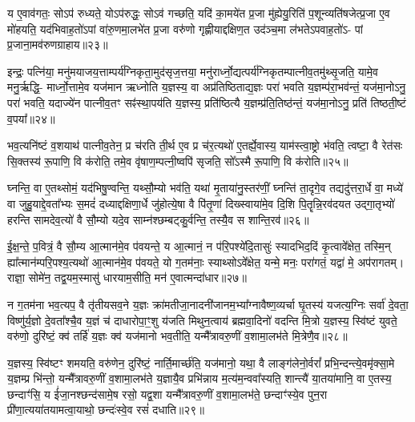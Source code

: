 य ए॒वाव॑गतः॒ सो\-ऽप॑ रुध्यते॒ यो\-ऽप॑रुद्धः॒ सो\-ऽव॑ गच्छति॒ यदि॑ का॒मये॑त प्र॒जा मु॑ह्येयु॒रिति॑ प॒शून्व्यति॑षजेत्प्र॒जा ए॒व मो॑हयति॒ यद॑भिवाह॒तो॑\-ऽपां वा॑रु॒णमा॒लभे॑त प्र॒जा वरु॑णो गृह्णीयाद्दक्षिण॒त उद॑ञ्च॒मा ल॑भते\-ऽपवाह॒तो॑\-ऽ- पां प्र॒जाना॒मव॑रुणग्राहाय॥२३॥

{\anuvakamend[{रेतो॒ यज॑माने दधाति लो॒क ऐ॒न्द्रꣳ स॒प्तत्रिꣳ॑शच्च॥५॥}]}

इन्द्रः॒ पत्नि॑या॒ मनु॑मयाजय॒त्ताम्पर्य॑ग्निकृता॒मुद॑सृज॒त्तया॒ मनु॑रार्ध्नो॒द्यत्पर्य॑ग्निकृतम्पात्नीव॒तमु॑थ्सृ॒जति॒ यामे॒व मनु॒र्\mbox{}ऋद्धि॒- मार्ध्नो॒त्तामे॒व यज॑मान ऋध्नोति य॒ज्ञस्य॒ वा अप्र॑तिष्ठिताद्य॒ज्ञः परा॑ भवति य॒ज्ञम्प॑रा॒भव॑न्तं॒ यज॑मा॒नो\-ऽनु॒ परा॑ भवति॒ यदाज्ये॑न पात्नीव॒तꣳ सꣴ॑स्था॒पय॑ति य॒ज्ञस्य॒ प्रति॑ष्ठित्यै य॒ज्ञम्प्र॑ति॒तिष्ठ॑न्तं॒ यज॑मा॒नो\-ऽनु॒ प्रति॑ तिष्ठती॒ष्टं व॒पया᳚॥२४॥

भव॒त्यनि॑ष्टं व॒शयाथ॑ पात्नीव॒तेन॒ प्र च॑रति ती॒र्थ ए॒व प्र च॑र॒त्यथो॑ ए॒तर्\mbox{}ह्ये॒वास्य॒ याम॑स्त्वा॒ष्ट्रो भ॑वति॒ त्वष्टा॒ वै रेत॑सः सि॒क्तस्य॑ रू॒पाणि॒ वि क॑रोति॒ तमे॒व वृ॑षाण॒म्पत्नी॒ष्वपि॑ सृजति॒ सो᳚\-ऽस्मै रू॒पाणि॒ वि क॑रोति॥२५॥

{\anuvakamend[{व॒पया॒ षट्त्रिꣳ॑शच्च॥६॥}]}

घ्नन्ति॒ वा ए॒तथ्सोमं॒ यद॑भिषु॒ण्वन्ति॒ यथ्सौ॒म्यो भव॑ति॒ यथा॑ मृ॒ताया॑नु॒स्तर॑णीं॒ घ्नन्ति॑ ता॒दृगे॒व तद्यदु॑त्तरा॒र्धे वा॒ मध्ये॑ वा जुहु॒याद्दे॒वता᳚भ्यः स॒मदं॑ दध्याद्दक्षिणा॒र्धे जु॑होत्ये॒षा वै पि॑तृ॒णां दिख्स्वाया॑मे॒व दि॒शि पि॒तॄन्नि॒रव॑दयत उद्गा॒तृभ्यो॑ हरन्ति सामदेव॒त्यो॑ वै सौ॒म्यो यदे॒व साम्न॑श्छम्बट्कु॒र्वन्ति॒ तस्यै॒व स शान्ति॒रव॑॥२६॥

ई॒क्ष॒न्ते॒ प॒वित्रं॒ वै सौ॒म्य आ॒त्मान॑मे॒व प॑वयन्ते॒ य आ॒त्मानं॒ न प॑रि॒पश्ये॑दि॒तासुः॑ स्यादभिद॒दिं कृ॒त्वावे᳚क्षेत॒ तस्मि॒न् ह्या᳚त्मान॑म्परि॒पश्य॒त्यथो॑ आ॒त्मान॑मे॒व प॑वयते॒ यो ग॒तम॑नाः॒ स्याथ्सो\-ऽवे᳚क्षेत॒ यन्मे॒ मनः॒ परा॑गतं॒ यद्वा॑ मे॒ अप॑रागतम्। राज्ञा॒ सोमे॑न॒ तद्व॒यम॒स्मासु॑ धारयाम॒सीति॒ मन॑ ए॒वात्मन्दा॑धार॥२७॥

न ग॒तम॑ना भव॒त्यप॒ वै तृ॑तीयसव॒ने य॒ज्ञः क्रा॑मतीजा॒नादनी॑जानम॒भ्या᳚ग्नावैष्ण॒व्यर्चा घृ॒तस्य॑ यजत्य॒ग्निः सर्वा॑ दे॒वता॒ विष्णु॑र्य॒ज्ञो दे॒वता᳚श्चै॒व य॒ज्ञं च॑ दाधारोपा॒ꣳ॒शु य॑जति मिथुन॒त्वाय॑ ब्रह्मवा॒दिनो॑ वदन्ति मि॒त्रो य॒ज्ञस्य॒ स्वि॑ष्टं युवते॒ वरु॑णो॒ दुरि॑ष्टं॒ क्व॑ तर्\mbox{}हि॑ य॒ज्ञः क्व॑ यज॑मानो भव॒तीति॒ यन्मै᳚त्रावरु॒णीं व॒शामा॒लभ॑ते मि॒त्रेणै॒व॥२८॥

य॒ज्ञस्य॒ स्वि॑ष्टꣳ शमयति॒ वरु॑णेन॒ दुरि॑ष्टं॒ नार्ति॒मार्च्छ॑ति॒ यज॑मानो॒ यथा॒ वै लाङ्ग॑लेनो॒र्वरां᳚ प्रभि॒न्दन्त्ये॒वमृ॑क्सा॒मे य॒ज्ञम्प्र भि॑न्तो॒ यन्मै᳚त्रावरु॒णीं व॒शामा॒लभ॑ते य॒ज्ञायै॒व प्रभि॑न्नाय म॒त्य॑म॒न्ववा᳚स्यति॒ शान्त्यै॑ या॒तया॑मानि॒ वा ए॒तस्य॒ छन्दाꣳ॑सि॒ य ई॑जा॒नश्छन्द॑सामे॒ष रसो॒ यद्व॒शा यन्मै᳚त्रावरु॒णीं व॒शामा॒लभ॑ते॒ छन्दाꣳ॑स्ये॒व पुन॒रा प्री॑णा॒त्यया॑तयामत्वा॒याथो॒ छन्दः॑स्वे॒व रसं॑ दधाति॥२९॥

